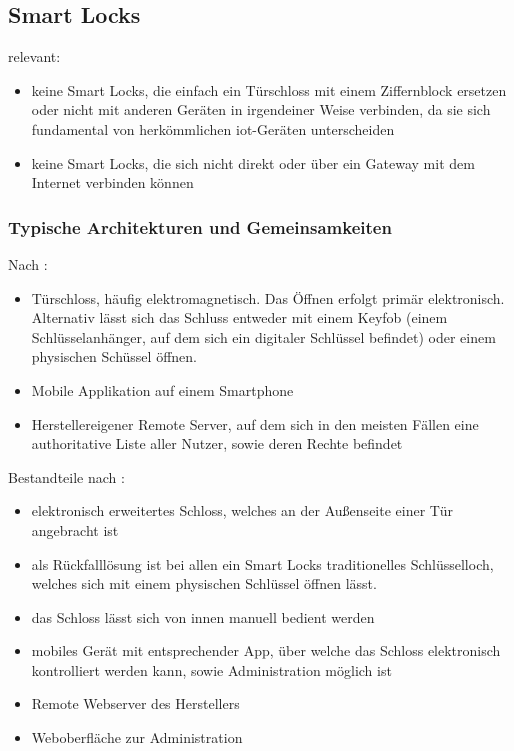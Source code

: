 \subsection{Smart Locks}
\label{sec:sota_smart_locks}

	relevant: \cite{Ye2017}\cite{Fuller2017}\cite{Rose2016}\cite{Ho2016}
	
	\begin{itemize}
	    \item keine Smart Locks, die einfach ein Türschloss mit einem Ziffernblock ersetzen oder nicht mit anderen Geräten in irgendeiner Weise verbinden, da sie sich fundamental von herkömmlichen \gls{iot}-Geräten unterscheiden\cite{Ho2016}
	    \item keine Smart Locks, die sich nicht direkt oder über ein Gateway mit dem Internet verbinden können\cite{Ho2016}
	\end{itemize}
	
	\subsubsection{Typische Architekturen und Gemeinsamkeiten}
	    Nach \citeauthor{Ye2017}:
		\begin{itemize}
			\item Türschloss, häufig elektromagnetisch. Das Öffnen erfolgt primär elektronisch. Alternativ lässt sich das Schluss entweder mit einem Keyfob (einem Schlüsselanhänger, auf dem sich ein digitaler Schlüssel befindet) oder einem physischen Schüssel öffnen.
			\item Mobile Applikation auf einem Smartphone
			\item Herstellereigener Remote Server, auf dem sich in den meisten Fällen eine authoritative Liste aller Nutzer, sowie deren Rechte befindet
		\end{itemize}

		Bestandteile nach \citeauthor{Ho2016}:
		\begin{itemize}
		    \item elektronisch erweitertes Schloss, welches an der Außenseite einer Tür angebracht ist
		    \item als Rückfalllösung ist bei allen ein Smart Locks traditionelles Schlüsselloch, welches sich mit einem physischen Schlüssel öffnen lässt.
		    \item das Schloss lässt sich von innen manuell bedient werden
		    \item mobiles Gerät mit entsprechender App, über welche das Schloss elektronisch kontrolliert werden kann, sowie Administration möglich ist
		    \item Remote Webserver des Herstellers
		    \item Weboberfläche zur Administration
		\end{itemize}

